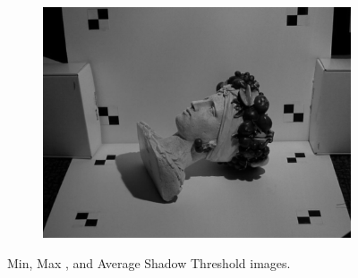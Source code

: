 \documentclass[10pt]{article}
\begin{document}
\begin{figure}[h!]
\begin{subfigure}[b]{0.32\linewidth}
    \end{subfigure}
    \begin{subfigure}[b]{0.32\linewidth}
           \centering
            \includegraphics[width=\linewidth]{chiquita/shadowThreshImg.jpg}    
            \end{subfigure}
        \caption{Min, Max , and Average Shadow Threshold images.}\label{}
\end{figure}
\end{document}
